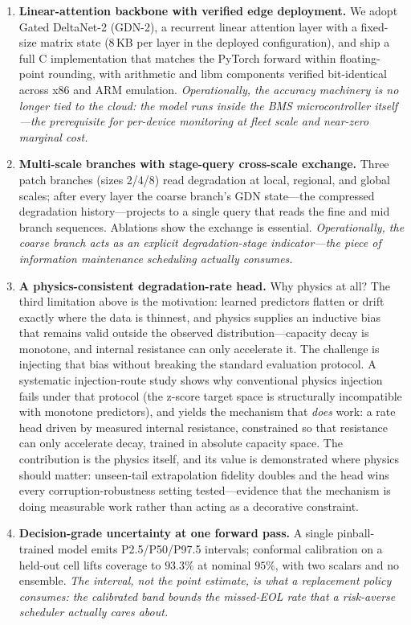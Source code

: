 \begin{enumerate}
\item \textbf{Linear-attention backbone with verified edge
deployment.} We adopt Gated DeltaNet-2 (GDN-2), a recurrent linear
attention layer with a fixed-size matrix state (8\,KB per layer in
the deployed configuration), and ship a full C
implementation that matches the PyTorch forward within
floating-point rounding, with arithmetic and libm components
verified bit-identical across x86 and ARM emulation. \emph{Operationally, the
accuracy machinery is no longer tied to the cloud: the model runs
inside the BMS microcontroller itself---the prerequisite for
per-device monitoring at fleet scale and near-zero marginal cost.}

\item \textbf{Multi-scale branches with stage-query cross-scale
exchange.} Three patch branches (sizes 2/4/8) read degradation at
local, regional, and global scales; after every layer the coarse
branch's GDN state---the compressed degradation history---projects to
a single query that reads the fine and mid branch sequences.
Ablations show the exchange is essential. \emph{Operationally, the
coarse branch acts as an explicit degradation-stage indicator---the
piece of information maintenance scheduling actually consumes.}

\item \textbf{A physics-consistent degradation-rate head.} Why
physics at all? The third limitation above is the motivation:
learned predictors flatten or drift exactly where the data is
thinnest, and physics supplies an inductive bias that remains valid
outside the observed distribution---capacity decay is monotone, and
internal resistance can only accelerate it. The challenge is
injecting that bias without breaking the standard evaluation
protocol. A systematic injection-route study shows why conventional
physics injection fails under that protocol (the z-score target
space is structurally incompatible with monotone predictors), and
yields the mechanism that \emph{does} work: a rate head driven
by measured internal resistance, constrained so that resistance can
only accelerate decay, trained in absolute capacity space. The contribution is the
physics itself, and its value is demonstrated where physics should
matter: unseen-tail extrapolation fidelity doubles and the head wins
every corruption-robustness setting tested---evidence that the
mechanism is doing measurable work rather than acting as a
decorative constraint.

\item \textbf{Decision-grade uncertainty at one forward pass.} A
single pinball-trained model emits P2.5/P50/P97.5 intervals;
conformal calibration on a held-out cell lifts coverage to $93.3\%$
at nominal $95\%$, with two scalars and no ensemble. \emph{The
interval, not the point estimate, is what a replacement policy
consumes: the calibrated band bounds the missed-EOL rate that a
risk-averse scheduler actually cares about.}
\end{enumerate}

